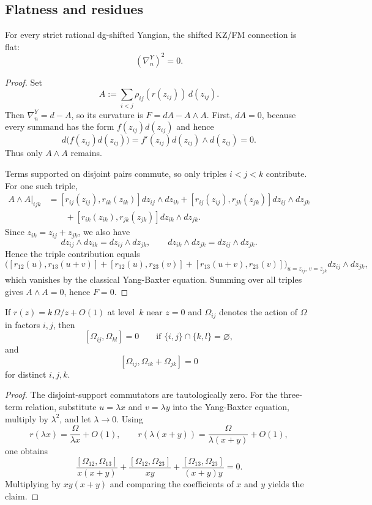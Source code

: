 \subsection{Flatness and residues}

\begin{theorem}%
For every strict rational dg-shifted Yangian, the shifted KZ/FM connection is flat:
\[
 (\nabla_n^Y)^2=0.
\]
\end{theorem}

\begin{proof}
Set
\[
 A:=\sum_{i<j}\rho_{ij}(r(z_{ij}))\,d(z_{ij}).
\]
Then $\nabla_n^Y=d-A$, so its curvature is $F=dA-A\wedge A$. First, $dA=0$, because every summand has the form $f(z_{ij})d(z_{ij})$ and hence
\[
 d\big(f(z_{ij})d(z_{ij})\big)=f'(z_{ij})d(z_{ij})\wedge d(z_{ij})=0.
\]
Thus only $A\wedge A$ remains.

Terms supported on disjoint pairs commute, so only triples $i<j<k$ contribute. For one such triple,
\begin{align*}
 A\wedge A\big|_{ijk}
 &= [r_{ij}(z_{ij}),r_{ik}(z_{ik})]dz_{ij}\wedge dz_{ik}
 + [r_{ij}(z_{ij}),r_{jk}(z_{jk})]dz_{ij}\wedge dz_{jk} \\
 &\qquad + [r_{ik}(z_{ik}),r_{jk}(z_{jk})]dz_{ik}\wedge dz_{jk}.
\end{align*}
Since $z_{ik}=z_{ij}+z_{jk}$, we also have
\[
 dz_{ij}\wedge dz_{ik}=dz_{ij}\wedge dz_{jk},
 \qquad
 dz_{ik}\wedge dz_{jk}=dz_{ij}\wedge dz_{jk}.
\]
Hence the triple contribution equals
\[
 \Big([r_{12}(u),r_{13}(u+v)] + [r_{12}(u),r_{23}(v)] + [r_{13}(u+v),r_{23}(v)]\Big)_{u=z_{ij},\,v=z_{jk}}dz_{ij}\wedge dz_{jk},
\]
which vanishes by the classical Yang-Baxter equation. Summing over all triples gives $A\wedge A=0$, hence $F=0$.
\end{proof}

\begin{lemma}%
If $r(z)=k\,\Omega/z+O(1)$ at level~$k$ near $z=0$ and $\Omega_{ij}$ denotes the action of $\Omega$ in factors $i,j$, then
\[
 [\Omega_{ij},\Omega_{kl}]=0 \qquad \text{if }\{i,j\}\cap\{k,l\}=\varnothing,
\]
and
\[
 [\Omega_{ij},\Omega_{ik}+\Omega_{jk}]=0
\]
for distinct $i,j,k$.
\end{lemma}

\begin{proof}
The disjoint-support commutators are tautologically zero. For the three-term relation, substitute $u=\lambda x$ and $v=\lambda y$ into the Yang-Baxter equation, multiply by $\lambda^2$, and let $\lambda\to 0$. Using
\[
 r(\lambda x)=\frac{\Omega}{\lambda x}+O(1),
 \qquad
 r(\lambda(x+y))=\frac{\Omega}{\lambda(x+y)}+O(1),
\]
one obtains
\[
 \frac{[\Omega_{12},\Omega_{13}]}{x(x+y)}+
 \frac{[\Omega_{12},\Omega_{23}]}{xy}+
 \frac{[\Omega_{13},\Omega_{23}]}{(x+y)y}=0.
\]
Multiplying by $xy(x+y)$ and comparing the coefficients of $x$ and $y$ yields the claim.
\end{proof}

